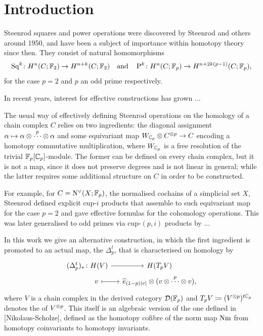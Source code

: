 
\section{Introduction}

Steenrod squares and power operations were discovered by Steenrod and others around 1950, and have been a subject of importance within homotopy theory since then.
They consist of natural homomorphisms
\[
\operatorname{Sq}^k\colon H^n(C;{\mathbb{F}_2})\to H^{n+k}(C;{\mathbb{F}_2})\quad  \text{and} \quad\operatorname{P}^k \colon H^n(C; {\mathbb{F}_p})\to H^{n+2k(p-1)}(C;{\mathbb{F}_p}),
\]
for the case \(p=2\) and \(p\) an odd prime respectively.

In recent years, interest for effective constructions has grown \cite{??}... 

The usual way of effectively defining Steenrod operations on the homology of a chain complex \(C\) relies on two ingredients: the diagonal assignment \(\alpha\mapsto \alpha\otimes\overset{p}{\cdots}\otimes \alpha\) and some equivariant map \(W_{\mathbb{C}_p}\otimes C^{\otimes p}\to C\) encoding a homotopy commutative multiplication, where \(W_{\mathbb{C}_p}\) is a free resolution of the trivial \({\mathbb{F}_p}[\mathbb{C}_p]\)-module.
The former can be defined on every chain complex, but it is not a map, since it does not preserve degrees and is not linear in general; while the latter requires some additional structure on \(C\) in order to be constructed.

For example, for \(C=\operatorname{N^{\vee}} (X;{\mathbb{F}_p})\),  the normalised cochains of a simplicial set \(X\), Steenrod defined explicit cup-\(i\) products that assemble to such equivariant map for the case \(p=2\) and gave effective formulas for the cohomology operations.
This was later generalised to odd primes via cup-\((p,i)\) products by \cite{??}...

In this work we give an alternative construction, in which the first ingredient is promoted to an actual map, the  \(\Delta_p^t\), that is characterised on homology by
\[
\begin{tikzcd}[row sep=0, column sep=small]
	(\Delta^t_p)_* &[-20pt] \colon H(V) \arrow[r] & H(T_pV) \\
	& v \arrow[r, |->] & \widehat{e}_{(1-p)|v|} \ot (v\ot \overset{p}{\cdots}\ot v),
\end{tikzcd}
\]
where \(V\) is a chain complex in the derived category \(\mathcal{D}({\mathbb{F}_p})\) and \(T_pV\coloneqq (V^{\otimes p})^{t\mathbb{C}_p}\) denotes the  of \(V^{\otimes p}\).
This itself is an algebraic version of the one defined in [Nikolaus-Scholze], defined as the homotopy cofibre of the norm map \(\mathrm{Nm}\) from homotopy coinvariants to homotopy invariants.

